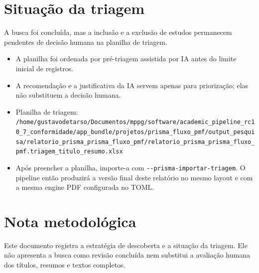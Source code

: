 \documentclass[12pt,a4paper]{article}
\begin{document}
\section{Situação da triagem}
\label{sec:org316ed90}
A busca foi concluída, mas a inclusão e a exclusão de estudos permanecem pendentes de decisão humana na planilha de triagem.
\begin{itemize}
\item A planilha foi ordenada por pré-triagem assistida por IA antes do limite inicial de registros.
\item A recomendação e a justificativa da IA servem apenas para priorização; elas não substituem a decisão humana.
\item Planilha de triagem: \texttt{/home/gustavodetarso/Documentos/mppg/software/academic\_pipeline\_rc10\_7\_conformidade/app\_bundle/projetos/prisma\_fluxo\_pmf/output\_pesquisa/relatorio\_prisma\_prisma\_fluxo\_pmf/relatorio\_prisma\_prisma\_fluxo\_pmf.triagem\_titulo\_resumo.xlsx}
\item Após preencher a planilha, importe-a com \texttt{-{}-prisma-importar-triagem}. O pipeline então produzirá a versão final deste relatório no mesmo layout e com a mesma engine PDF configurada no TOML.
\end{itemize}

\section{Nota metodológica}
\label{sec:orgbc929dc}
Este documento registra a estratégia de descoberta e a situação da triagem. Ele não apresenta a busca como revisão concluída nem substitui a avaliação humana dos títulos, resumos e textos completos.
\end{document}
